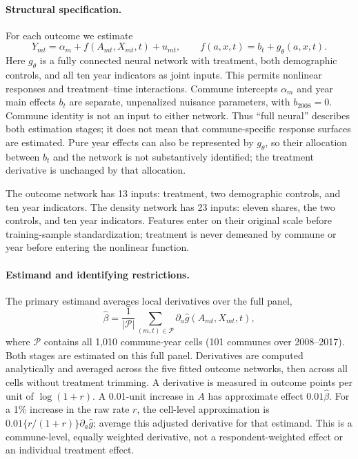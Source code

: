 \documentclass{article}
\begin{document}
\paragraph{Structural specification.}
For each outcome we estimate
\begin{equation}
Y_{mt}=\alpha_m+f(A_{mt},X_{mt},t)+u_{mt},\qquad
f(a,x,t)=b_t+g_\theta(a,x,t).
\label{eq:neural-panel}
\end{equation}
Here $g_\theta$ is a fully connected neural network with treatment, both demographic controls, and all ten year indicators as joint inputs. This permits nonlinear responses and treatment--time interactions. Commune intercepts $\alpha_m$ and year main effects $b_t$ are separate, unpenalized nuisance parameters, with $b_{2008}=0$. Commune identity is not an input to either network. Thus ``full neural'' describes both estimation stages; it does not mean that commune-specific response surfaces are estimated. Pure year effects can also be represented by $g_\theta$, so their allocation between $b_t$ and the network is not substantively identified; the treatment derivative is unchanged by that allocation.

The outcome network has 13 inputs: treatment, two demographic controls, and ten year indicators. The density network has 23 inputs: eleven shares, the two controls, and ten year indicators. Features enter on their original scale before training-sample standardization; treatment is never demeaned by commune or year before entering the nonlinear function.

\paragraph{Estimand and identifying restrictions.}
The primary estimand averages local derivatives over the full panel,
\begin{equation}
\widehat\beta=\frac{1}{|\mathcal P|}
\sum_{(m,t)\in\mathcal P}\partial_a\widehat g(A_{mt},X_{mt},t),
\label{eq:neural-effect}
\end{equation}
where $\mathcal P$ contains all 1,010 commune-year cells (101 communes over 2008--2017). Both stages are estimated on this full panel. Derivatives are computed analytically and averaged across the five fitted outcome networks, then across all cells without treatment trimming. A derivative is measured in outcome points per unit of $\log(1+r)$. A 0.01-unit increase in $A$ has approximate effect $0.01\widehat\beta$. For a 1\% increase in the raw rate $r$, the cell-level approximation is $0.01\{r/(1+r)\}\partial_a\widehat g$; average this adjusted derivative for that estimand. This is a commune-level, equally weighted derivative, not a respondent-weighted effect or an individual treatment effect.
\end{document}
